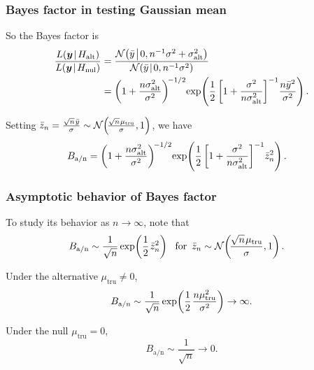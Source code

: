 \documentclass[18pt, handout]{beamer}
\newcommand{\defineTightSpacing}{%
	\setlength{\abovedisplayskip}{.25\baselineskip}%
	\setlength{\belowdisplayskip}{.25\baselineskip}%
}
\newcommand{\given}{\mskip.7\thinmuskip | \mskip.7\thinmuskip}
\newcommand{\midGiven}{\mskip.7\thinmuskip \middle| \mskip.7\thinmuskip}
\newcommand{\thinnerspace}{\mskip.5\thinmuskip}
\newcommand{\normalDist}{\operatorname{\mathcal{N}}}
\newcommand{\truthSub}{\mathrm{tru}}
\newcommand{\likelihood}{L}
\newcommand{\by}{\bm{y}}
\newcommand{\hypothesis}{H}
\newcommand{\nullSub}{\mathrm{nul}}
\newcommand{\altSub}{\mathrm{alt}}
\newcommand{\bayesFacAlt}{B_{\mathrm{a} / \mathrm{n}}}
\begin{document}
\begin{frame}
\frametitle{Bayes factor in testing Gaussian mean}

So the Bayes factor is
\begin{equation*} \defineTightSpacing%
\begin{aligned}
\frac{%
	\likelihood(\by \given \hypothesis_\altSub)%
}{%
	\likelihood(\by \given \hypothesis_\nullSub) 
}
	&= \frac{
		\normalDist\!\left(
			\bar{y} \midGiven 0, n^{-1} \sigma^2 + \sigma_\altSub^2
		\right)
	}{
		\normalDist\!\left(
			\bar{y} \midGiven 0, n^{-1} \sigma^2
		\right)
	} \\
	&= \left( 1 + \frac{n \sigma_\altSub^2}{\sigma^2} \right)^{\!-1/2} \!
	\exp\!\left(
		\frac{1}{2} 
		\left[ 1 + \frac{\sigma^2}{n \sigma_\altSub^2} \right]^{-1} \!
		\frac{n \bar{y}^2}{\sigma^2}
	\right).
\end{aligned}
\end{equation*}

Setting $\bar{z}_n = \frac{\sqrt{n} \thinnerspace \bar{y}}{\sigma} \sim \normalDist\!\left(\! \frac{\sqrt{n} \thinnerspace \mu_\truthSub}{\sigma}, 1 \right)$, we have
\begin{equation*} \defineTightSpacing%
\begin{aligned}
\bayesFacAlt
	&= \left( 1 + \frac{n \sigma_\altSub^2}{\sigma^2} \right)^{\!-1/2} \!
	\exp\!\left(
		\frac{1}{2} 
		\left[ 1 + \frac{\sigma^2}{n \sigma_\altSub^2} \right]^{-1} \!
		\bar{z}_n^2
	\right).
\end{aligned}
\end{equation*}
\end{frame}


\begin{frame}
\frametitle{Asymptotic behavior of Bayes factor}
To study its behavior as $n \to \infty$, note that
\begin{equation*} \defineTightSpacing%
\begin{aligned}
\bayesFacAlt
	&\sim \frac{1}{\sqrt{n}} 
	\exp\!\left(
		\frac{1}{2} \thinnerspace \bar{z}_n^2
	\right)
	\ \text{ for } \,
	\bar{z}_n \sim \normalDist\!\left(\! \frac{\sqrt{n} \thinnerspace \mu_\truthSub}{\sigma}, 1 \right).
\end{aligned}
\end{equation*}

\medskip
Under the alternative $\mu_\truthSub \neq 0$, 
$$\displaystyle 
\bayesFacAlt
	\sim \frac{1}{\sqrt{n}} 
	\exp\!\left(
		\frac{1}{2} \thinnerspace \frac{n \mu_\truthSub^2}{\sigma^2}
	\right) \to \infty.$$

Under the null $\mu_\truthSub = 0$,
$$\displaystyle
\bayesFacAlt \sim \frac{1}{\sqrt{n}} \to 0.$$
\end{frame}
\end{document}
